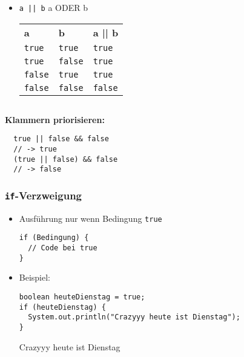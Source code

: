 \documentclass{../../presentation}
\begin{document}
\begin{frame}[fragile]
\begin{columns}
    \begin{column}{0.5\textwidth}
      \newline
      \pause
      \begin{itemize}
        \item \texttt{a || b} \quad \textrightarrow \quad a ODER b\\[0.3em]
              \pause
              {
                \begin{tabular}{l l l}
                  \rowcolor{tablehead}
                  \textbf{a}     & \textbf{b}     & \textbf{a || b} \\
                  \texttt{true}  & \texttt{true}  & \texttt{true}   \\
                  \texttt{true}  & \texttt{false} & \texttt{true}   \\
                  \texttt{false} & \texttt{true}  & \texttt{true}   \\
                  \texttt{false} & \texttt{false} & \texttt{false}  \\
                \end{tabular}
              }
      \end{itemize}
    \end{column}
  \end{columns}
  \vspace{0.5cm}
  \pause
  \textbf{Klammern priorisieren:}
  \begin{verbatim}
  true || false && false 
  // -> true
  (true || false) && false
  // -> false
  \end{verbatim}
\end{frame}

\begin{frame}[fragile]
  \frametitle{\texttt{if}-Verzweigung}
  \pause
  \begin{itemize}
    \item Ausführung nur wenn Bedingung \texttt{true}
          \pause
          \begin{verbatim}
if (Bedingung) {
  // Code bei true
}
      \end{verbatim}
          \pause
    \item Beispiel:
          \begin{verbatim}
boolean heuteDienstag = true;
if (heuteDienstag) {
  System.out.println("Crazyyy heute ist Dienstag");
}
      \end{verbatim}
          \pause
          \begin{ausgabe}
            Crazyyy heute ist Dienstag
          \end{ausgabe}
  \end{itemize}
\end{frame}
\end{document}
